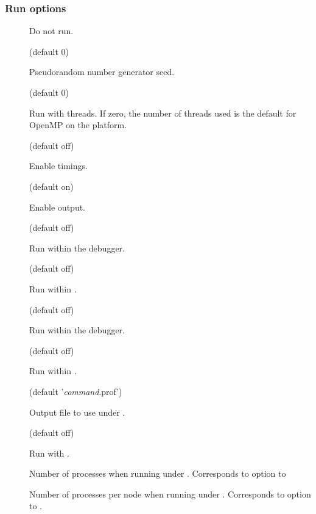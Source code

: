 \subsubsection{Run options}

\begin{description}
\item[]

Do not run.

\item[] (default 0)

Pseudorandom number generator seed.

\item[] (default 0)

Run with  threads. If zero, the number of threads used is the
default for OpenMP on the platform.

\item[] (default off)

Enable timings.

\item[] (default on)

Enable output.

\item[] (default off)

Run within the  debugger.

\item[] (default off)

Run within .

\item[] (default off)

Run within the  debugger.

\item[] (default off)

Run within .

\item[] (default '\textsl{command}.prof')

Output file to use under .

\item[] (default off)

Run with .

\item[]

Number of processes when running under . Corresponds to 
option to 

\item[]

Number of processes per node when running under . Corresponds to
 option to .

\end{description}

